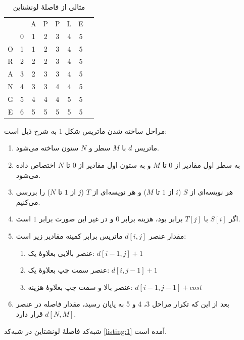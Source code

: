 \documentclass[12pt,onecolumn,a4paper]{article}
\begin{document}
    \begin{table}[H]
        \caption{مثالی از فاصلۀ لونشتاین}
        \label{table:1}
        \centering\setLTR
        \begin{tabular}{c|ccccccc|}
            \multicolumn{1}{c}{} & \multicolumn{1}{c}{} & \cellcolor{blue!25}A & \cellcolor{blue!25}P & \cellcolor{blue!25}P & \cellcolor{blue!25}L & \cellcolor{blue!25}E \tabularnewline \hhline{~|*{6}{-}}
            & 0 & 1 & 2 & 3 & 4 & 5  \tabularnewline
            \cellcolor{blue!25}O & 1 & 1 & 2 & 3 & 4 & 5   \tabularnewline
            \cellcolor{blue!25}R & 2 & 2 & 2 & 3 & 4 & 5   \tabularnewline
            \cellcolor{blue!25}A & 3 & 2 & 3 & 3 & 4 & 5   \tabularnewline
            \cellcolor{blue!25}N & 4 & 3 & 3 & 4 & 4 & 5   \tabularnewline
            \cellcolor{blue!25}G & 5 & 4 & 4 & 4 & 5 & 5   \tabularnewline
            \cellcolor{blue!25}E & 6 & 5 & 5 & 5 & 5 & 5   \tabularnewline
        \end{tabular}
        \setRTL
    \end{table}

    \par
    مراحل ساخته شدن ماتریس شکل 1 به شرح ذیل است:
    \begin{enumerate}
        \item ماتریس $d$ با $M$ سطر و $N$ ستون ساخته می‌شود.
        \item به سطر اول مقادیر از $0$ تا $M$ و به ستون اول مقادیر از $0$ تا $N$ اختصاص داده می‌شود.
        \item هر نویسه‌ای از $S$ ($i$ از $1$ تا $M$)  و هر نویسه‌ای از $T$ ($j$ از $1$ تا $N$) را بررسی می‌کنیم.
        \item اگر $S[i]$ با $T[j]$ برابر بود، هزینه برابر $0$ و در غیر این صورت برابر $1$ است.
        \item مقدار عنصر $d[i, j]$ ماتریس برابر کمینه مقادیر زیر است:
        \begin{enumerate}
            \item عنصر بالایی بعلاوۀ یک: $d[i-1, j]+1$
            \item عنصر سمت چپ بعلاوۀ یک: $d[i, j-1]+1$
            \item عنصر بالا و سمت چپ بعلاوۀ هزینه: $d[i-1, j-1]+cost$
        \end{enumerate}
        \item بعد از این که تکرار مراحل 3، 4 و 5 به پایان رسید، مقدار فاصله در عنصر $d[N,M]$ قرار دارد.
    \end{enumerate}

    \par
    شبه‌کد فاصلۀ لونشتاین در شبه‌کد \ref{listing:1} آمده است.
\end{document}
